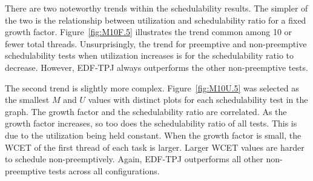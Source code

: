 \begin{table}
  \centering
  
\end{table}

There are two noteworthy trends within the schedulability results.
The simpler of the two is the relationship between utilization and
schedulability ratio for a fixed growth
factor. Figure~\ref{fig:M10F.5} illustrates the trend common among 10
or fewer total threads. Unsurprisingly, the trend for preemptive and
non-preemptive schedulability tests when utilization increases is for the
schedulability ratio to decrease. However, EDF-TPJ always outperforms
the other non-preemptive tests. 

The second trend is slightly more complex. Figure~\ref{fig:M10U.5} was
selected as the smallest ${M}$ and ${U}$ values with distinct plots
for each schedulability test in the graph. The growth factor and the
schedulability ratio are correlated. As the growth factor increases,
so too does the schedulability ratio of all tests. This is due to
the utilization being held constant. When the growth factor is small,
the WCET of the first thread of each task is larger. Larger WCET values
are harder to schedule non-preemptively. Again, EDF-TPJ outperforms
all other non-preemptive tests across all configurations.

